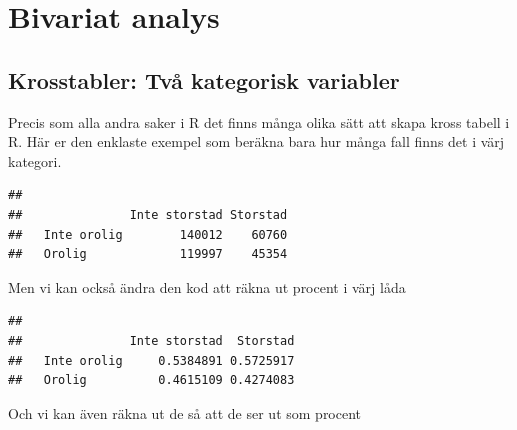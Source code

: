 \documentclass[
]{book}
\newenvironment{Shaded}{\begin{snugshade}}{\end{snugshade}}
\newcommand{\DecValTok}[1]{\textcolor[rgb]{0.00,0.00,0.81}{#1}}
\newcommand{\FunctionTok}[1]{\textcolor[rgb]{0.13,0.29,0.53}{\textbf{#1}}}
\newcommand{\NormalTok}[1]{#1}
\newcommand{\SpecialCharTok}[1]{\textcolor[rgb]{0.81,0.36,0.00}{\textbf{#1}}}
\begin{document}
\chapter{Bivariat analys}\label{bivariat-analys}

\section{Krosstabler: Två kategorisk variabler}\label{krosstabler-tvuxe5-kategorisk-variabler}

Precis som alla andra saker i R det finns många olika sätt att skapa kross tabell i R. Här er den enklaste exempel som beräkna bara hur många fall finns det i värj kategori.

\begin{Shaded}
\end{Shaded}

\begin{verbatim}
##              
##               Inte storstad Storstad
##   Inte orolig        140012    60760
##   Orolig             119997    45354
\end{verbatim}

Men vi kan också ändra den kod att räkna ut procent i värj låda

\begin{Shaded}
\end{Shaded}

\begin{verbatim}
##              
##               Inte storstad  Storstad
##   Inte orolig     0.5384891 0.5725917
##   Orolig          0.4615109 0.4274083
\end{verbatim}

Och vi kan även räkna ut de så att de ser ut som procent

\begin{Shaded}
\end{Shaded}
\end{document}
